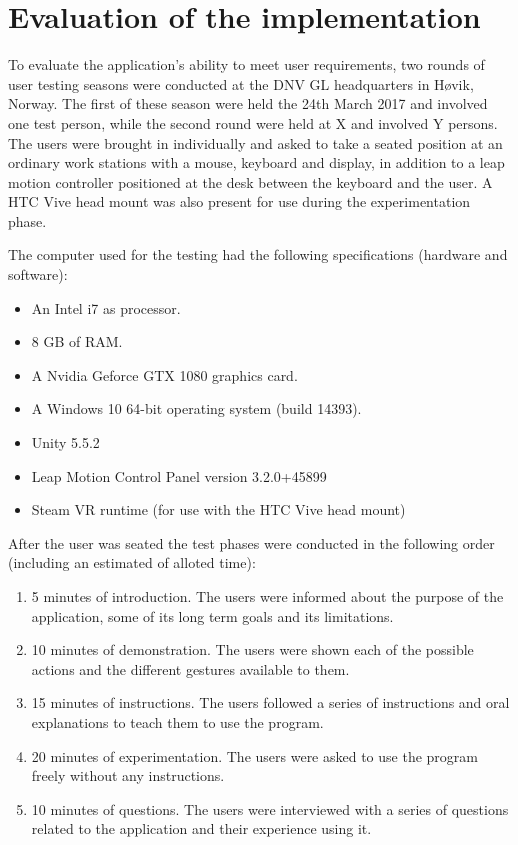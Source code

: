 \chapter{Evaluation of the implementation}

To evaluate the application's ability to meet user requirements, two rounds of user testing seasons were conducted at the DNV GL headquarters in Høvik, Norway.
The first of these season were held the 24th March 2017 and involved one test person, while the second round were held at X and involved Y persons. 
The users were brought in individually and asked to take a seated position at an ordinary work stations with a mouse, keyboard and display, 
in addition to a leap motion controller positioned at the desk between the keyboard and the user. A HTC Vive head mount was also present for use during the experimentation phase. 

The computer used for the testing had the following specifications (hardware and software):
\begin{itemize}
    \item An Intel i7 as processor.
    \item 8 GB of RAM.
    \item A Nvidia Geforce GTX 1080 graphics card.
    \item A Windows 10 64-bit operating system (build 14393).
    \item Unity 5.5.2
    \item Leap Motion Control Panel version 3.2.0+45899
    \item Steam VR runtime (for use with the HTC Vive head mount)
\end{itemize}

After the user was seated the test phases were conducted in the following order (including an estimated of alloted time):

\begin{enumerate}
    \item  5 minutes of introduction. The users were informed about the purpose of the application, some of its long term goals and its limitations.
    \item 10 minutes of demonstration. The users were shown each of the possible actions and the different gestures available to them.
    \item 15 minutes of instructions. The users followed a series of instructions and oral explanations to teach them to use the program.
    \item 20 minutes of experimentation. The users were asked to use the program freely without any instructions.  
    \item 10 minutes of questions. The users were interviewed with a series of questions related to the application and their experience using it.   
\end{enumerate}

